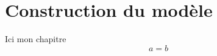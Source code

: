 \documentclass[main.tex]{subfiles}
\begin{document}
\chapter{Construction du modèle}
Ici mon chapitre
\begin{equation}
\label{eq:test}
a=b
\end{equation}
\end{document}
